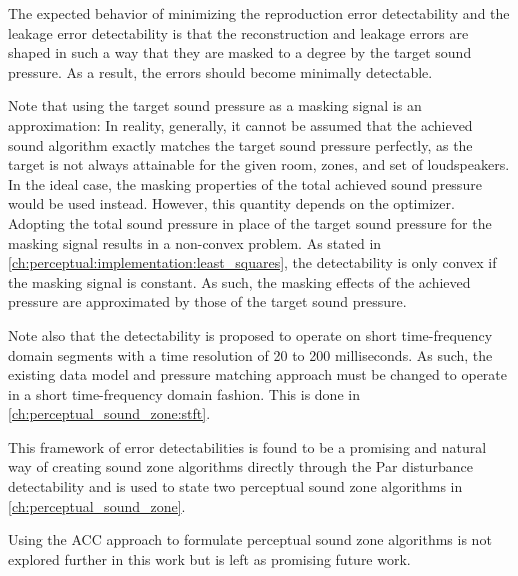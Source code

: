 The expected behavior of minimizing the reproduction error detectability and the leakage error detectability is that the reconstruction and leakage errors are shaped in such a way that they are masked to a degree by the 
target sound pressure.
As a result, the errors should become minimally detectable.

Note that using the target sound pressure as a masking signal is an approximation: 
In reality, generally, it cannot be assumed that the achieved sound algorithm exactly matches the target sound pressure perfectly, as the target is not always attainable for the given room, zones, and set of loudspeakers.
In the ideal case, the masking properties of the total achieved sound pressure would be used instead.
However, this quantity depends on the optimizer.
Adopting the total sound pressure in place of the target sound pressure for the masking signal results in a non-convex 
problem.
As stated in \autoref{ch:perceptual:implementation:least_squares}, the detectability is only convex if the masking signal 
is constant.
As such, the masking effects of the achieved pressure are approximated by those of the target sound pressure.

Note also that the detectability is proposed to operate on short time-frequency domain segments 
with a time resolution of 20 to 200 milliseconds. 
As such, the existing data model and pressure matching approach must be changed to operate in a short time-frequency 
domain fashion.
This is done in \autoref{ch:perceptual_sound_zone:stft}.

This framework of error detectabilities is found to be a promising and natural way of creating sound zone algorithms directly through the Par disturbance detectability and is used to state two perceptual sound zone algorithms in \autoref{ch:perceptual_sound_zone}.

Using the ACC approach to formulate perceptual sound zone algorithms is not explored further in this work but is left as promising future work.
